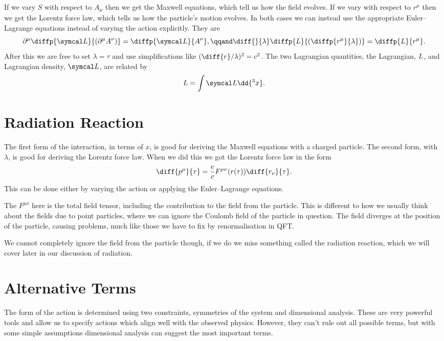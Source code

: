 If we vary \(S\) with respect to \(A_\mu\) then we get the Maxwell equations, which tell us how the field evolves.
If we vary with respect to \(r^{\mu}\) then we get the Lorentz force law, which tells us how the particle's motion evolves.
In both cases we can instead use the appropriate Euler--Lagrange equations instead of varying the action explicitly.
They are
\begin{equation}
    \partial^\mu \diffp{\lagrangianDensity}{(\partial^\mu A^\nu)} = \diffp{\lagrangianDensity}{A^\nu}, \qqand \diff{}{\lambda}\diffp{\lagrangian}{\left( \diffp{r^\mu}{\lambda} \right)} = \diffp{\lagrangian}{r^\mu}.
\end{equation}
After this we are free to set \(\lambda = \tau\) and use simplifications like \((\diff{r}/{\lambda})^2 = c^2\).
The two Lagrangian quantities, the Lagrangian, \(L\), and Lagrangian density, \(\lagrangianDensity\), are related by
\begin{equation}
    \lagrangian = \int \lagrangianDensity \dd{^3x}.
\end{equation}

\section{Radiation Reaction}
The first form of the interaction, in terms of \(x\), is good for deriving the Maxwell equations with a charged particle.
The second form, with \(\lambda\), is good for deriving the Lorentz force law.
When we did this we got the Lorentz force law in the form
\begin{equation}
    \diff{p^\mu}{\tau} = \frac{e}{c} F^{\mu\nu}(r(\tau)) \diff{r_\nu}{\tau}.
\end{equation}
This can be done either by varying the action or applying the Euler--Lagrange equations.

The \(F^{\mu\nu}\) here is the total field tensor, including the contribution to the field from the particle.
This is different to how we usually think about the fields due to point particles, where we can ignore the Coulomb field of the particle in question.
The field diverges at the position of the particle, causing problems, much like those we have to fix by renormalisation in QFT.

We cannot completely ignore the field from the particle though, if we do we miss something called the radiation reaction, which we will cover later in our discussion of radiation.

\section{Alternative Terms}
The form of the action is determined using two constraints, symmetries of the system and dimensional analysis.
These are very powerful tools and allow us to specify actions which align well with the observed physics.
However, they can't rule out all possible terms, but with some simple assumptions dimensional analysis can suggest the most important terms.

